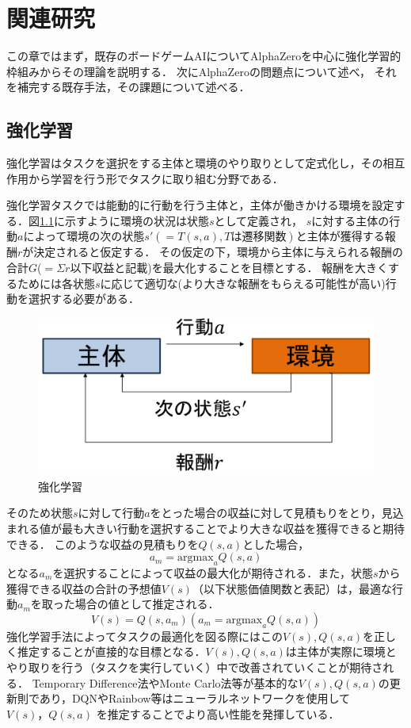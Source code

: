 \chapter{関連研究}
この章ではまず，既存のボードゲームAIについてAlphaZeroを中心に強化学習的枠組みからその理論を説明する．
次にAlphaZeroの問題点について述べ，
それを補完する既存手法，その課題について述べる．



\section{強化学習}
強化学習はタスクを選択をする主体と環境のやり取りとして定式化し，その相互作用から学習を行う形でタスクに取り組む分野である\cite{RL}．

強化学習タスクでは能動的に行動を行う主体と，主体が働きかける環境を設定する．図\ref{fig:RL}に示すように環境の状況は状態$s$として定義され，
$s$に対する主体の行動$a$によって環境の次の状態${s'}(=T(s, a), Tは遷移関数)$と主体が獲得する報酬$r$が決定されると仮定する．
その仮定の下，環境から主体に与えられる報酬の合計$G$($=\Sigma r$以下収益と記載)を最大化することを目標とする．
報酬を大きくするためには各状態$s$に応じて適切な(より大きな報酬をもらえる可能性が高い)行動を選択する必要がある．
\begin{figure}[htbp]
	\centering
	\includegraphics[width=\linewidth]{./figure/RL.png}
	\caption{強化学習}
	\label{fig:RL}
\end{figure}
そのため状態$s$に対して行動$a$をとった場合の収益に対して見積もりをとり，見込まれる値が最も大きい行動を選択することでより大きな収益を獲得できると期待できる．
このような収益の見積もりを$Q(s, a)$とした場合，
\begin{equation}
	{\displaystyle a_m = {\textrm{argmax}}_{a} Q(s, a)}
\end{equation}
となる$a_m$を選択することによって収益の最大化が期待される．また，状態$s$から獲得できる収益の合計の予想値$V(s)$（以下状態価値関数と表記）は，最適な行動$a_m$を取った場合の値として推定される．
\begin{equation}
	{\displaystyle V(s) = Q(s, a_m)(a_m = \textrm{argmax}_{a} Q(s, a))}
\end{equation}
強化学習手法によってタスクの最適化を図る際にはこの$V(s),Q(s, a)$を正しく推定することが直接的な目標となる．$V(s),Q(s, a)$は主体が実際に環境とやり取りを行う（タスクを実行していく）中で改善されていくことが期待される．
Temporary Difference法やMonte Carlo法等が基本的な$V(s),Q(s, a)$の更新則であり，DQN\cite{DQN}やRainbow\cite{rainbow}等はニューラルネットワークを使用して$V(s)，Q(s, a)$
を推定することでより高い性能を発揮している．



